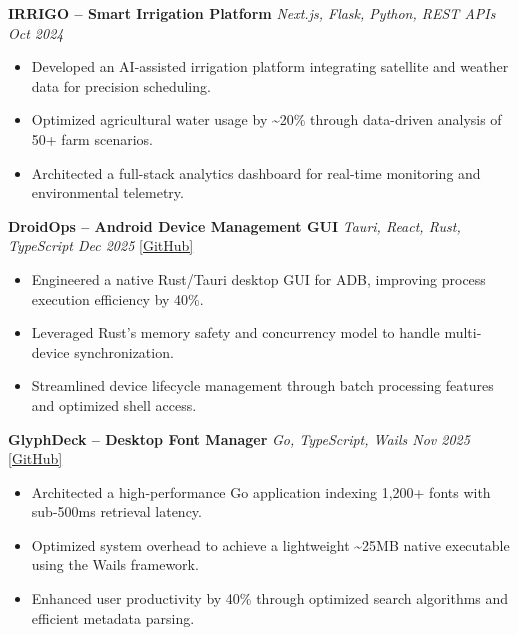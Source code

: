 \documentclass[10pt, a4paper]{article}
\begin{document}
\vspace{3pt}

\textbf{IRRIGO -- Smart Irrigation Platform} \hfill \textit{Next.js, Flask, Python, REST APIs \quad Oct 2024}
\begin{itemize}
\item Developed an AI-assisted irrigation platform integrating satellite and weather data for precision scheduling.
\item Optimized agricultural water usage by \textasciitilde20\% through data-driven analysis of 50+ farm scenarios.
\item Architected a full-stack analytics dashboard for real-time monitoring and environmental telemetry.
\end{itemize}

\vspace{3pt}

\textbf{DroidOps -- Android Device Management GUI} \hfill \textit{Tauri, React, Rust, TypeScript \quad Dec 2025} \quad \href{https://github.com/your-github/droidops}{[GitHub]}
\begin{itemize}
\item Engineered a native Rust/Tauri desktop GUI for ADB, improving process execution efficiency by 40\%.
\item Leveraged Rust's memory safety and concurrency model to handle multi-device synchronization.
\item Streamlined device lifecycle management through batch processing features and optimized shell access.
\end{itemize}

\vspace{3pt}

\textbf{GlyphDeck -- Desktop Font Manager} \hfill \textit{Go, TypeScript, Wails \quad Nov 2025} \quad \href{https://github.com/your-github/GlyphDeck}{[GitHub]}
\begin{itemize}
\item Architected a high-performance Go application indexing 1,200+ fonts with sub-500ms retrieval latency.
\item Optimized system overhead to achieve a lightweight \textasciitilde25MB native executable using the Wails framework.
\item Enhanced user productivity by 40\% through optimized search algorithms and efficient metadata parsing.
\end{itemize}

\end{document}
